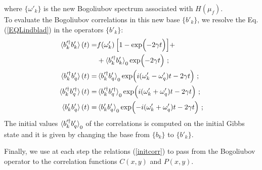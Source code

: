 \documentclass[pra,twocolumn,preprintnumbers,amsmath,amssymb,nofootinbib,floatfix,longbibliography]{revtex4}
\begin{document}
where $\{\omega'_k\}$ is the new Bogoliubov spectrum
associated with $H(\mu_f)$.\\
To evaluate the Bogoliubov correlations in this new base
$\{b'_k\}$, we resolve the Eq. (\ref{EQLindblad}) in the
operators $\{b'_k\}$:
\begin{align}
  \label{EQLindbladprime}
  \braket{b'^\dagger_k b'_k}(t) =& f(\omega'_k) \,
  \Bigr[ 1 - \exp\Bigl( -2 \gamma t \Bigl) \Bigr]+ \notag\\
    & + \braket{b'^\dagger_k b'_k}_0
    \exp\Bigl( -2 \gamma t \Bigl) \,\,;\\
  \braket{b'^\dagger_k b'_q}(t) =&
  \braket{b'^\dagger_k b'_q}_0
  \exp\Bigl( i(\omega'_k - \omega'_q)t-2 \gamma t \Bigl)
  \,\,;\\
  \braket{b'^\dagger_k b'^\dagger_q}(t) =&
  \braket{b'^\dagger_k b'^\dagger_q}_0
  \exp\Bigl( i(\omega'_k + \omega'_q)t-2 \gamma t \Bigl)
  \,\,;\\
  \braket{b'_k b'_q}(t) =&
  \braket{b'_k b'_q}_0
  \exp\Bigl( -i(\omega'_k + \omega'_q)t-2 \gamma t \Bigl)
  \,\,;\\
\end{align}
The initial values $\braket{b'^\dagger_k b'_q}_0$ of the
correlations is computed on the initial Gibbs state and
it is given by changing the base from
$\{b_k \}$ to $\{b'_k\}$.

Finally, we use at each step the relations
(\ref{initcorr}) to pass from the Bogoliubov operator to
the correlation functions $C(x,y)$ and $P(x,y)$.


\end{document}
